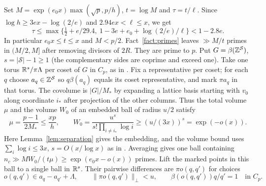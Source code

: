 Set $M=\exp(e_0x)\max(\sqrt p,p/h)$, $t=\log M$ and $\tau=t/\ell$.
Since $\log h\ge3ex-\log(2/e)$ and $2.94ex<\ell\le x$, we get
\begin{equation}\label{eq:tau-red}
 \tau\le\max\{\tfrac12+e/29.4,\ 1-3e+e_0+\log(2/e)/\ell\}<1-2.8e .
\end{equation}
In particular $e_0x\le t\le x$ and $M<p/2$.
Fact~\ref{fact:primes} leaves $\gg M/t$ primes in $(M/2,M]$ after removing divisors of $2R$.
They are prime to $p$. Put $G=\beta(\mathbb Z^{\mathcal S})$, $s=|\mathcal S|-1\ge1$
(the complementary sides are coprime and exceed one). Take one torus
$\mathbb R^s/\pi\Lambda$ per coset of $G$ in $C_p$, as in
\cite[proof of Lemma~6.2, overlap count]{Z29}.
Fix a representative per coset; for each $q$ choose $a_q\in\mathbb Z^{\mathcal S}$
so $q\beta(a_q)$ equals its coset representative, and mark $\pi a_q$ in that torus.
The covolume is $|G|/M_*$ by expanding a lattice basis starting with $v_0$
along coordinate $i_*$ after projection of the other columns. Thus the total
volume $\mu$ and the volume $W_0$ of an embedded ball of radius $u/2$ satisfy
\[
 \mu=\frac{p-1}{2M_*}\le\frac{xp}{h},\qquad
 W_0=\frac{u^s}{s!\prod_{i\ne i_*}\log i}\ge(u/(3x))^s=\exp(-o(x)).
\]
Here Lemma~\ref{lem:separation} gives the embedding, and the volume bound uses
$\sum_i\log i\le3x$, $s=O(x/\log x)$ as in \cite[proof of Lemma~7.2, transverse volume]{Z29}.
Averaging gives one ball containing $n_c\gg MW_0/(t\mu)\ge\exp(e_0x-o(x))$ primes.
Lift the marked points in this ball to a single ball in $\mathbb R^s$.
Their pairwise differences are $\pi o(q,q')$ for choices
\[
 o(q,q')\in a_q-a_{q'}+\Lambda,\qquad
 \|\pi o(q,q')\|_\perp<u,\qquad \beta(o(q,q'))q/q'=1\quad\text{in } C_p .
\]

